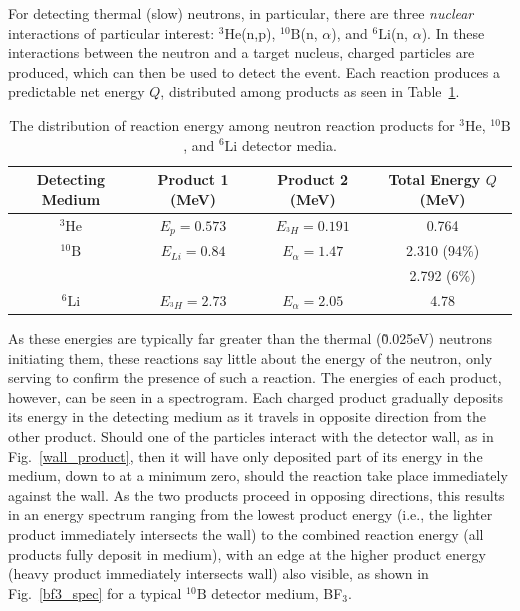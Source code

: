 \documentclass[12pt]{article}
\newcommand{\figref}[1]{Fig.~\ref{#1}}
\newcommand{\HeThree}{$\mathrm{^3He}$\xspace}
\newcommand{\BTen}{$\mathrm{^{10}B}$\xspace}
\newcommand{\LiSix}{$\mathrm{^6Li}$\xspace}
\begin{document}
For detecting thermal (slow) neutrons, in particular, there are three \emph{nuclear} interactions of particular interest: \HeThree(n,p), \BTen(n, $\alpha$), and \LiSix(n, $\alpha$).
In these interactions between the neutron and a target nucleus, charged particles are produced, which can then be used to detect the event.
Each reaction produces a predictable net energy $Q$, distributed among products as seen in Table~\ref{tab:qvals}\cite{npre_lab_9_manual_2025}.\\

\begin{table}
    \centering
    \caption{The distribution of reaction energy among neutron reaction products for \HeThree, \BTen, and \LiSix detector media.\cite{npre_lab_9_manual_2025}}
    \label{tab:qvals}
    \begin{tabular}{c|ccc}
        \hline
        Detecting Medium & Product 1 (MeV) & Product 2 (MeV) & Total Energy $Q$ (MeV) \\
        \hline
        \HeThree & ${E_p}=0.573$ & ${E_{^3H}}=0.191$ & 0.764 \\
        \hdashline
        \BTen & ${E_{Li}}=0.84$ & $E_{\alpha}=1.47$ & 2.310 (94\%) \\
                                                    &&& 2.792 (6\%) \\
        \hdashline
        \LiSix & $E_{^3H}=2.73$ & $E_\alpha=2.05$ & 4.78\\
        \hline
    \end{tabular}
\end{table}

As these energies are typically far greater than the thermal (\~0.025eV) neutrons initiating them, these reactions say little about the energy of the neutron, only serving to confirm the presence of such a reaction.
The energies of each product, however, can be seen in a spectrogram.
Each charged product gradually deposits its energy in the detecting medium as it travels in opposite direction from the other product.
Should one of the particles interact with the detector wall, as in \figref{wall_product}, then it will have only deposited part of its energy in the medium, down to at a minimum zero, should the reaction take place immediately against the wall.
As the two products proceed in opposing directions, this results in an energy spectrum ranging from the lowest product energy (i.e., the lighter product immediately intersects the wall) to the combined reaction energy (all products fully deposit in medium), with an edge at the higher product energy (heavy product immediately intersects wall) also visible, as shown in \figref{bf3_spec} for a typical \BTen detector medium, BF$_3$.\\
\end{document}
